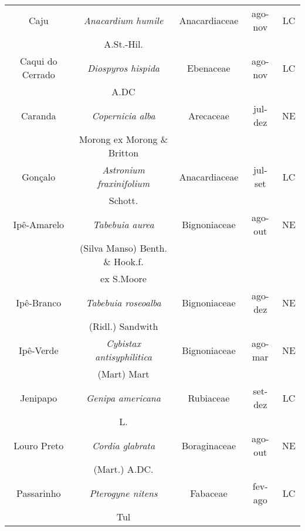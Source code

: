 \documentclass[
	12pt,				%
	oneside,			%
	a4paper,			%
	english,			%
	french,				%
	spanish,			%
	brazil				%
	]{configuracoes/tcc}
\begin{document}
\begin{anexosenv}
\begin{table}[h]
\begin{tabular}{ccccc}
			Caju 			 & \textit{Anacardium humile}  	    		& Anacardiaceae & ago-nov 			& LC 				\\
							 &  A.St.-Hil.					    		&				&			    	&					\\
			
			Caqui do Cerrado & \textit{Diospyros hispida}  	    		& Ebenaceae 	& ago-nov 			& LC 				\\
							 &  A.DC						    		&				&				   	&					\\
			
			Caranda 		 & \textit{Copernicia alba}  	    		& Arecaceae 	& jul-dez 			& NE 				\\
							 & Morong ex Morong \& Britton	    		&				&					&					\\
			
			Gonçalo 		 & \textit{Astronium fraxinifolium}			& Anacardiaceae & jul-set 			& LC 				\\
							 &  Schott.									&				&				    &					\\
			
			Ipê-Amarelo		 & \textit{Tabebuia aurea}   				& Bignoniaceae 	& ago-out 			& NE 				\\
							 & (Silva Manso) Benth. \&	Hook.f.			&				&				    &					\\
							 & ex S.Moore								&				&				    &					\\
						
			Ipê-Branco 		 & \textit{Tabebuia roseoalba}  			& Bignoniaceae 	& ago-dez			& NE 				\\
							 & (Ridl.) Sandwith 						&				&				    &					\\
			
			Ipê-Verde 		 & \textit{Cybistax antisyphilitica}		& Bignoniaceae  & ago-mar 			& NE 				\\
							 & (Mart) Mart 								&				&				    &					\\
			
			Jenipapo 		 & \textit{Genipa americana}  				& Rubiaceae 	& set-dez 			& LC 				\\
							 & L. 										&				&				    &					\\
			
			Louro Preto 	 & \textit{Cordia glabrata}  				& Boraginaceae 	& ago-out 			& NE 				\\
							 & (Mart.) A.DC. 							&				&				    &					\\
			
			Passarinho 		 & \textit{Pterogyne nitens}  				& Fabaceae 		& fev-ago 			& LC 				\\
							 & Tul										&				&				    &					\\
			

\end{tabular}
\end{table}
\end{anexosenv}
\end{document}
